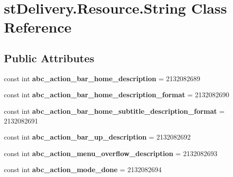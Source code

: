 \hypertarget{classst_delivery_1_1_resource_1_1_string}{}\section{st\+Delivery.\+Resource.\+String Class Reference}
\label{classst_delivery_1_1_resource_1_1_string}
\subsection*{Public Attributes}
\begin{DoxyCompactItemize}
\item 
\mbox{\label{classst_delivery_1_1_resource_1_1_string_aa5a247f2aad0dd8ba309d5712d5013a2}} 
const int {\bfseries abc\+\_\+action\+\_\+bar\+\_\+home\+\_\+description} = 2132082689
\item 
\mbox{\label{classst_delivery_1_1_resource_1_1_string_a00a918036438a135d77a86f3a8b5313b}} 
const int {\bfseries abc\+\_\+action\+\_\+bar\+\_\+home\+\_\+description\+\_\+format} = 2132082690
\item 
\mbox{\label{classst_delivery_1_1_resource_1_1_string_aadabfc0c3c2ba42045419426055736bf}} 
const int {\bfseries abc\+\_\+action\+\_\+bar\+\_\+home\+\_\+subtitle\+\_\+description\+\_\+format} = 2132082691
\item 
\mbox{\label{classst_delivery_1_1_resource_1_1_string_a13e52986c6f011b2c9b0189af7e5a49a}} 
const int {\bfseries abc\+\_\+action\+\_\+bar\+\_\+up\+\_\+description} = 2132082692
\item 
\mbox{\label{classst_delivery_1_1_resource_1_1_string_af1ca5aeda984bbd2cc8a4feb83e9e566}} 
const int {\bfseries abc\+\_\+action\+\_\+menu\+\_\+overflow\+\_\+description} = 2132082693
\item 
\mbox{\label{classst_delivery_1_1_resource_1_1_string_ace54a9b7f823cf4fdb390f7bdf8e7cef}} 
const int {\bfseries abc\+\_\+action\+\_\+mode\+\_\+done} = 2132082694
\item 

\end{DoxyCompactItemize}
